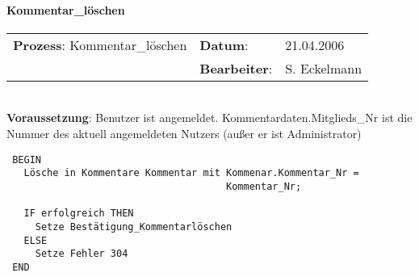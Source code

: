 \paragraph{Kommentar\_löschen}
\begin{tabular}[t]{p{9.5cm}ll}
\textbf{Prozess}: Kommentar\_löschen  	&\textbf{Datum}:      &21.04.2006\\
					&\textbf{Bearbeiter}: &S. Eckelmann\\
\end{tabular}

\hrulefill\\
\textbf{Voraussetzung}: Benutzer ist angemeldet. Kommentardaten.Mitglieds\_Nr ist die Nummer des aktuell angemeldeten Nutzers (außer er ist Administrator)
\begin{verbatim}
 BEGIN
   Lösche in Kommentare Kommentar mit Kommenar.Kommentar_Nr = 
                                      Kommentar_Nr;
   
   IF erfolgreich THEN
     Setze Bestätigung_Kommentarlöschen
   ELSE
     Setze Fehler 304
 END
\end{verbatim}
\hrulefill
